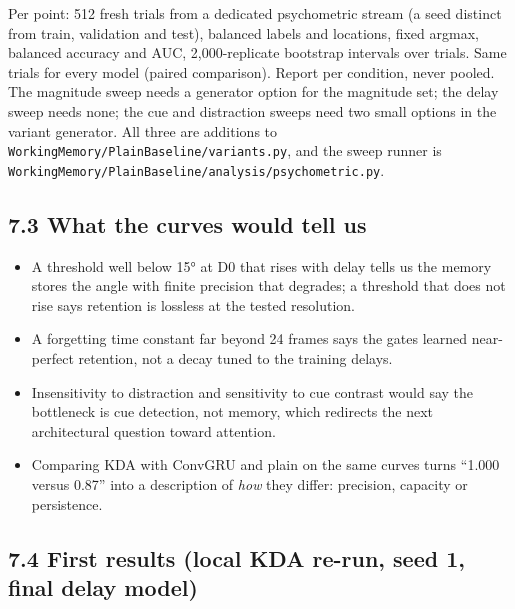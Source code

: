 \documentclass[

]{article}
\newcounter{none} %
\providecommand{\tightlist}{%

  \setlength{\itemsep}{0pt}\setlength{\parskip}{0pt}}
\begin{document}
Per point: 512 fresh trials from a dedicated psychometric stream (a seed distinct from train, validation and test), balanced labels and locations, fixed argmax, balanced accuracy and AUC, 2,000-replicate bootstrap intervals over trials. Same trials for every model (paired comparison). Report per condition, never pooled. The magnitude sweep needs a generator option for the magnitude set; the delay sweep needs none; the cue and distraction sweeps need two small options in the variant generator. All three are additions to \texttt{WorkingMemory/PlainBaseline/variants.py}, and the sweep runner is \texttt{WorkingMemory/PlainBaseline/analysis/psychometric.py}.



\subsection{7.3 What the curves would tell us}\label{what-the-curves-would-tell-us}



\begin{itemize}

\tightlist

\item

  A threshold well below 15° at D0 that rises with delay tells us the memory stores the angle with finite precision that degrades; a threshold that does not rise says retention is lossless at the tested resolution.

\item

  A forgetting time constant far beyond 24 frames says the gates learned near-perfect retention, not a decay tuned to the training delays.

\item

  Insensitivity to distraction and sensitivity to cue contrast would say the bottleneck is cue detection, not memory, which redirects the next architectural question toward attention.

\item

  Comparing KDA with ConvGRU and plain on the same curves turns ``1.000 versus 0.87'' into a description of \emph{how} they differ: precision, capacity or persistence.

\end{itemize}



\subsection{7.4 First results (local KDA re-run, seed 1, final delay model)}\label{first-results-local-kda-re-run-seed-1-final-delay-model-1}
\end{document}
